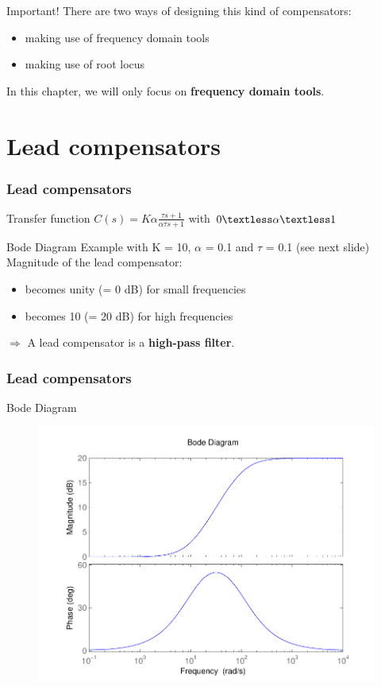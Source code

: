 \begin{frame}
\begin{block}{Important!}
There are two ways of designing this kind of compensators:
\begin{itemize}
\item making use of frequency domain tools
\item making use of root locus
\end{itemize}
In this chapter, we will only focus on {\bf frequency domain tools}.
\end{block}
\end{frame}

\section{Lead compensators}

\begin{frame}
\frametitle{Lead compensators}
	\begin{block}{Transfer function}
		$C(s) = K\alpha\frac{\tau s + 1}{\alpha\tau s + 1}$ with $0 \textless  \alpha  \textless  1$
	\end{block}
	\begin{block}{Bode Diagram}
		Example with K = 10, $\alpha$ = 0.1 and $\tau$ = 0.1 (see next slide) \\
		Magnitude of the lead compensator:
		\begin{itemize}
			\item becomes unity (= 0 dB) for small frequencies
			\item becomes 10 (= 20 dB) for high frequencies
		\end{itemize}
		$\Rightarrow$ A lead compensator is a {\bf high-pass filter}.
	\end{block}
\end{frame}

\begin{frame}
\frametitle{Lead compensators}
\begin{block}{Bode Diagram}
\begin{figure}
	\centering
	\includegraphics[width=0.7
	\linewidth]{bodeleadfilter2}
\end{figure}
\end{block}
\end{frame}

